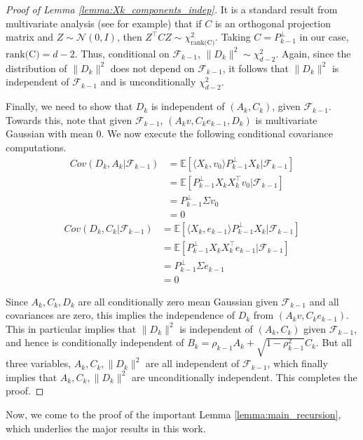 \documentclass[12pt]{article}
\def\gF{{\mathcal{F}}}
\def\gN{{\mathcal{N}}}
\newcommand{\E}{\mathbb{E}}
\begin{document}
\begin{proof}[Proof of Lemma \ref{lemma:Xk_components_indep}]
   
It is a standard result from multivariate analysis (see \citet{mardia2024multivariate} for example) that if $C$ is an orthogonal projection matrix and $Z\sim \gN(0,I)$, then $Z^\top CZ\sim\chi^2_{\text{rank(C)}}$. Taking $C=P_{k-1}^\perp$ in our case, $\text{rank(C)}=d-2$. Thus, conditional on $\gF_{k-1}$, $\|D_k\|^2\sim \chi^2_{d-2}$. Again, since the distribution of $\|D_k\|^2$ does not depend on $\gF_{k-1}$, it follows that $\|D_k\|^2$ is independent of $\gF_{k-1}$ and is unconditionally $\chi^2_{d-2}$.

Finally, we need to show that $D_k$ is independent of $(A_k,C_k)$, given $\gF_{k-1}$. Towards this, note that given $\gF_{k-1}$, $(A_kv, C_ke_{k-1},D_k)$ is multivariate Gaussian with mean $0$. We now execute the following conditional covariance computations.
\begin{align*}
    Cov(D_k,A_k|\gF_{k-1}) &= \E[\langle X_k,v_0\rangle P_{k-1}^\perp X_k|\gF_{k-1}]\\
    &=\E[P_{k-1}^\perp X_k X_k^\top v_0|\gF_{k-1}]\\
    &= P_{k-1}^\perp \Sigma v_0\\
    &= 0
\end{align*}
\begin{align*}
    Cov(D_k,C_k|\gF_{k-1}) &= \E[\langle X_k,e_{k-1}\rangle P_{k-1}^\perp X_k|\gF_{k-1}]\\
    &=\E[P_{k-1}^\perp X_k X_k^\top e_{k-1}|\gF_{k-1}]\\
    &= P_{k-1}^\perp \Sigma e_{k-1}\\
    &= 0
\end{align*}

Since $A_k,C_k,D_k$ are all conditionally zero mean Gaussian given $\gF_{k-1}$ and all covariances are zero, this implies the independence of $D_k$ from $(A_kv,C_ke_{k-1})$. This in particular implies that $\|D_k\|^2$ is independent of $(A_k,C_k)$ given $\gF_{k-1}$, and hence is conditionally independent of $B_k=\rho_{k-1}A_k+\sqrt{1-\rho^2_{k-1}}C_k$. But all three variables, $A_k, C_k,\|D_k\|^2$ are all independent of $\gF_{k-1}$, which finally implies that $A_k,C_k,\|D_k\|^2$ are unconditionally independent. This completes the proof.
\end{proof}

\medskip

Now, we come to the proof of the important Lemma \ref{lemma:main_recursion}, which underlies the major results in this work.

\medskip
\end{document}
